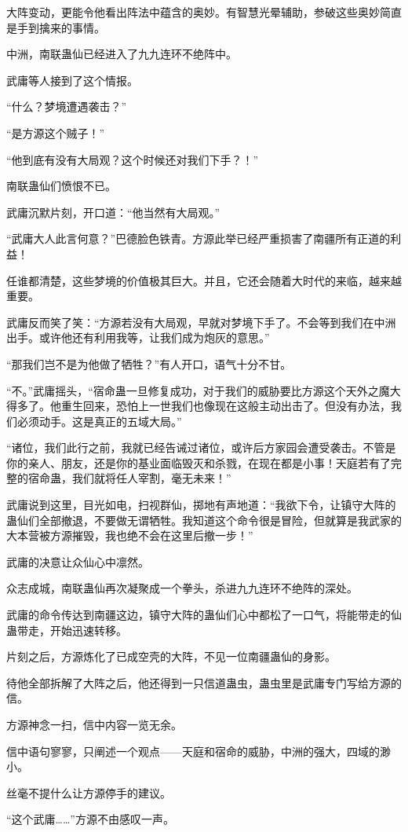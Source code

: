 \begin{this_body}
大阵变动，更能令他看出阵法中蕴含的奥妙。有智慧光晕辅助，参破这些奥妙简直是手到擒来的事情。

中洲，南联蛊仙已经进入了九九连环不绝阵中。

武庸等人接到了这个情报。

“什么？梦境遭遇袭击？”

“是方源这个贼子！”

“他到底有没有大局观？这个时候还对我们下手？！”

南联蛊仙们愤恨不已。

武庸沉默片刻，开口道：“他当然有大局观。”

“武庸大人此言何意？”巴德脸色铁青。方源此举已经严重损害了南疆所有正道的利益！

任谁都清楚，这些梦境的价值极其巨大。并且，它还会随着大时代的来临，越来越重要。

武庸反而笑了笑：“方源若没有大局观，早就对梦境下手了。不会等到我们在中洲出手。或许他还有利用我等，让我们成为炮灰的意思。”

“那我们岂不是为他做了牺牲？”有人开口，语气十分不甘。

“不。”武庸摇头，“宿命蛊一旦修复成功，对于我们的威胁要比方源这个天外之魔大得多了。他重生回来，恐怕上一世我们也像现在这般主动出击了。但没有办法，我们必须动手。这是真正的五域大局。”

“诸位，我们此行之前，我就已经告诫过诸位，或许后方家园会遭受袭击。不管是你的亲人、朋友，还是你的基业面临毁灭和杀戮，在现在都是小事！天庭若有了完整的宿命蛊，我们就将任人宰割，毫无未来！”

武庸说到这里，目光如电，扫视群仙，掷地有声地道：“我欲下令，让镇守大阵的蛊仙们全部撤退，不要做无谓牺牲。我知道这个命令很是冒险，但就算是我武家的大本营被方源摧毁，我也绝不会在这里后撤一步！”

武庸的决意让众仙心中凛然。

众志成城，南联蛊仙再次凝聚成一个拳头，杀进九九连环不绝阵的深处。

武庸的命令传达到南疆这边，镇守大阵的蛊仙们心中都松了一口气，将能带走的仙蛊带走，开始迅速转移。

片刻之后，方源炼化了已成空壳的大阵，不见一位南疆蛊仙的身影。

待他全部拆解了大阵之后，他还得到一只信道蛊虫，蛊虫里是武庸专门写给方源的信。

方源神念一扫，信中内容一览无余。

信中语句寥寥，只阐述一个观点——天庭和宿命的威胁，中洲的强大，四域的渺小。

丝毫不提什么让方源停手的建议。

“这个武庸……”方源不由感叹一声。


\end{this_body}
